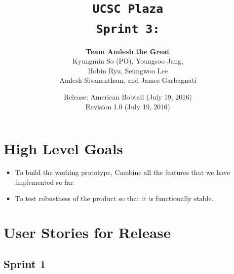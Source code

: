 \documentclass[10pt]{article}
\title{\color{primary}\texttt{UCSC Plaza \\ Sprint 3:}}
\author{{\color{secondary}\textbf{Team Amlesh the Great}} \\ Kyungmin So (PO), Youngsoo Jang, \\ Hobin Ryu, Seungwoo Lee \\ Amlesh Sivanantham, and James Garbagnati }
\date{Release: American Bobtail (July 19, 2016) \\ Revision 1.0 (July 19, 2016)}
\newcommand{\fancysecX}[2] {{\color{primary}\section*{#1} \label{sec:#2}}}
\newcommand{\fancysubX}[2] {{\color{primary}\subsection*{#1} \label{sec:#2}}}
\begin{document}
\maketitle

\fancysecX{High Level Goals}{goals}

    \begin{itemize}
        \item To build the working prototype, Combine all the features that we have implemented so far.
        \item To test robustness of the product so that it is functionally stable.
    \end{itemize}
    
\fancysecX{User Stories for Release}{stories}
    
    \fancysubX{Sprint 1}{sprint1}
     
\end{document}
